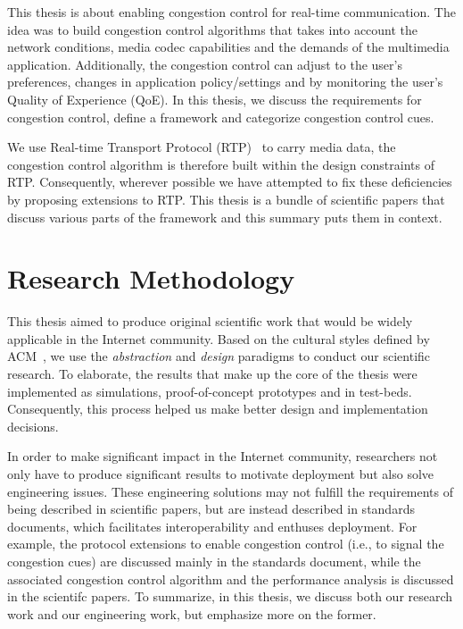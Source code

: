 This thesis is about enabling congestion control for real-time communication.
The idea was to build congestion control algorithms that takes into account
the network conditions, media codec capabilities and the demands of the
multimedia application. Additionally, the congestion control can adjust to the
user's preferences, changes in application policy/settings and by monitoring
the user's Quality of Experience (QoE). In this thesis, we discuss the
requirements for congestion control, define a framework and categorize
congestion control cues.


We use Real-time Transport Protocol (RTP)~\cite{rfc3550} to carry media data,
the congestion control algorithm is therefore built within the design
constraints of RTP. Consequently, wherever possible we have attempted to fix
these deficiencies by proposing extensions to RTP. This thesis is a bundle of
scientific papers that discuss various parts of the framework and this summary
puts them in context.


\section{Research Methodology}

This thesis aimed to produce original scientific work that would be widely
applicable in the Internet community. Based on the cultural styles defined by
ACM~\cite{Denning:CS.Method}, we use the \textit{abstraction} and
\textit{design} paradigms to conduct our scientific research. To elaborate,
the results that make up the core of the thesis were implemented as
simulations, proof-of-concept prototypes and in test-beds. Consequently, this
process helped us make better design and implementation decisions.

In order to make significant impact in the Internet community, researchers not
only have to produce significant results to motivate deployment but also solve
engineering issues. These engineering solutions may not fulfill the
requirements of being described in scientific papers, but are instead
described in standards documents, which facilitates interoperability and
enthuses deployment. For example, the protocol extensions to enable congestion
control (i.e., to signal the congestion cues) are discussed mainly in the
standards document, while the associated congestion control algorithm and the
performance analysis is discussed in the scientifc papers. To summarize, in
this thesis, we discuss both our research work and our engineering work, but
emphasize more on the former.



